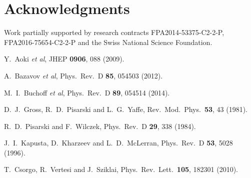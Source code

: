 \documentclass{PoS}
\begin{document}
\section*{Acknowledgments}
Work partially supported by  research contracts FPA2014-53375-C2-2-P, FPA2016-75654-C2-2-P and the Swiss National Science Foundation.
\begin{thebibliography}{99}

  Y.~Aoki {\em et al}, 
  JHEP {\bf 0906}, 088 (2009).
   
  A.~Bazavov {\em et al}, 
  Phys.\ Rev.\ D {\bf 85}, 054503 (2012).
 
  M.~I.~Buchoff {\em et al}, 
  Phys.\ Rev.\ D {\bf 89}, 054514 (2014).
 
  D.~J.~Gross, R.~D.~Pisarski and L.~G.~Yaffe,
  Rev.\ Mod.\ Phys.\  {\bf 53}, 43 (1981).

  R.~D.~Pisarski and F.~Wilczek,
  Phys.\ Rev.\ D {\bf 29}, 338 (1984).

  J.~I.~Kapusta, D.~Kharzeev and L.~D.~McLerran,
  Phys.\ Rev.\ D {\bf 53}, 5028 (1996).

  T.~Csorgo, R.~Vertesi and J.~Sziklai,
  Phys.\ Rev.\ Lett.\  {\bf 105}, 182301 (2010).


\end{thebibliography}
\end{document}
